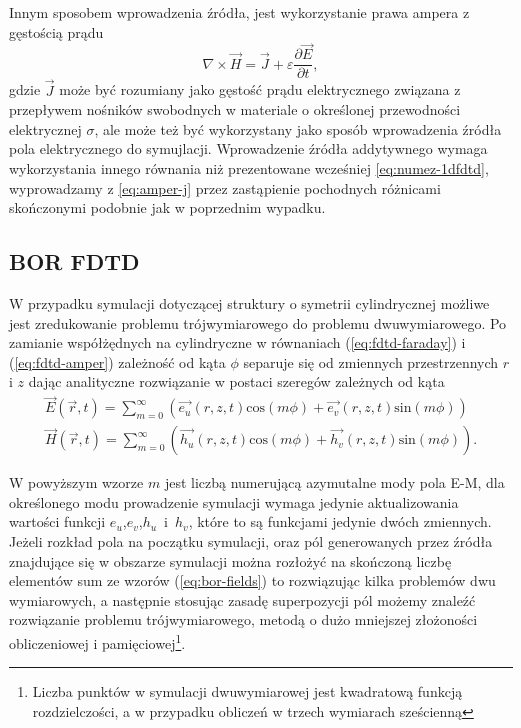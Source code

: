 Innym sposobem wprowadzenia źródła, jest wykorzystanie prawa ampera z gęstością prądu
\begin{equation}
\nabla \times \vec{H} = \vec{J} + \varepsilon \frac{\partial \vec{E}}{\partial t},
\label{eq:amper-j}
\end{equation}
gdzie $\vec{J}$ może być rozumiany jako gęstość prądu elektrycznego związana z przepływem nośników swobodnych w materiale o określonej przewodności elektrycznej $\sigma$, ale może też być wykorzystany jako sposób wprowadzenia źródła pola elektrycznego do symujlacji. Wprowadzenie źródła addytywnego wymaga wykorzystania innego równania niż prezentowane wcześniej \ref{eq:numez-1dfdtd}, wyprowadzamy z \ref{eq:amper-j} przez zastąpienie pochodnych różnicami skończonymi podobnie jak w poprzednim wypadku. 



\subsection{BOR FDTD}
\label{subart:borfdtd}
W przypadku symulacji dotyczącej struktury o symetrii cylindrycznej możliwe jest zredukowanie problemu trójwymiarowego do problemu dwuwymiarowego. Po zamianie współżędnych na cylindryczne w równaniach (\ref{eq:fdtd-faraday}) i (\ref{eq:fdtd-amper}) zależność od kąta $\phi$ separuje się od zmiennych przestrzennych $r$ i $z$ dając analityczne rozwiązanie w postaci szeregów zależnych od kąta
\begin{equation}
	\begin{gathered}
	\vec{E}(\vec{r},t)=\sum_{m=0}^{\infty}(\vec{e_u}(r,z,t) \textrm{cos}(m\phi)+\vec{e_v}(r,z,t)\textrm{sin}(m\phi)) \\
	\vec{H}(\vec{r},t)=\sum_{m=0}^{\infty}(\vec{h_u}(r,z,t) \textrm{cos}(m\phi)+\vec{h_v}(r,z,t)\textrm{sin}(m\phi)).
	\end{gathered}
	\label{eq:bor-fields}
\end{equation}

W powyższym wzorze $m$ jest liczbą numerującą azymutalne mody pola E-M, dla określonego modu prowadzenie symulacji wymaga jedynie aktualizowania wartości funkcji $e_u$,$e_v$,$h_u$~i~$h_v$, które to są funkcjami jedynie dwóch zmiennych. Jeżeli rozkład pola na początku symulacji, oraz pól generowanych przez źródła znajdujące się w obszarze symulacji można rozłożyć na skończoną liczbę elementów sum ze wzorów (\ref{eq:bor-fields}) to rozwiązując kilka problemów dwu wymiarowych, a następnie stosując zasadę superpozycji pól możemy znaleźć rozwiązanie problemu trójwymiarowego, metodą o dużo mniejszej złożoności obliczeniowej i pamięciowej\footnote{Liczba punktów w symulacji dwuwymiarowej jest kwadratową funkcją rozdzielczości, a w przypadku obliczeń w trzech wymiarach sześcienną}.

